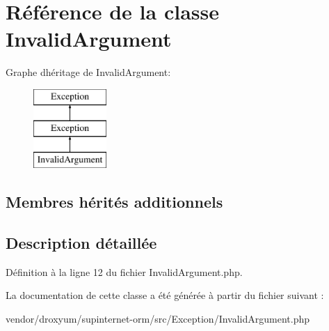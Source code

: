 \hypertarget{class_o_r_m_1_1_exception_1_1_invalid_argument}{}\section{Référence de la classe Invalid\+Argument}
\label{class_o_r_m_1_1_exception_1_1_invalid_argument}
Graphe d\textquotesingle{}héritage de Invalid\+Argument\+:\begin{figure}[H]
\begin{center}
\leavevmode
\includegraphics[height=3.000000cm]{class_o_r_m_1_1_exception_1_1_invalid_argument}
\end{center}
\end{figure}
\subsection*{Membres hérités additionnels}


\subsection{Description détaillée}


Définition à la ligne 12 du fichier Invalid\+Argument.\+php.



La documentation de cette classe a été générée à partir du fichier suivant \+:\begin{DoxyCompactItemize}
\item 
vendor/droxyum/supinternet-\/orm/src/\+Exception/Invalid\+Argument.\+php\end{DoxyCompactItemize}
